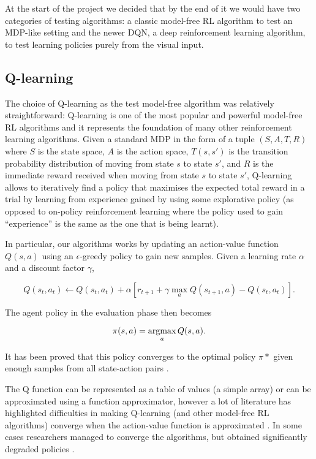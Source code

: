 At the start of the project we decided that by the end of it we would have two
categories of testing algorithms: a classic model-free RL algorithm to test an
MDP-like setting and the newer DQN, a deep reinforcement learning algorithm, to
test learning policies purely from the visual input.

\subsection{Q-learning}

The choice of Q-learning as the test model-free algorithm was relatively
straightforward: Q-learning \citep{watkins1992q} is one of the most popular and
powerful model-free RL algorithms and it represents the foundation of many other
reinforcement learning algorithms. Given a standard MDP in the form of a tuple
$(S, A, T, R)$ where $S$ is the state space, $A$ is the action space, $T(s, s')$
is the transition probability distribution of moving from state $s$ to state
$s'$, and $R$ is the immediate reward received when moving from state $s$ to
state $s'$, Q-learning allows to iteratively find a policy that maximises the
expected total reward in a trial by learning from experience gained by using
some explorative policy (as opposed to on-policy reinforcement learning where
the policy used to gain ``experience'' is the same as the one that is being
learnt).

In particular, our algorithms works by updating an action-value function $Q(s,
a)$ using an $\epsilon$-greedy policy to gain new samples. Given a learning rate
$\alpha$ and a discount factor $\gamma$,

\begin{equation}
  Q(s_t, a_t) \leftarrow Q(s_t, a_t) +
  \alpha \left[ r_{t+1} + \gamma \max_a Q(s_{t+1}, a) - Q(s_t, a_t) \right].
\label{eq:ql}
\end{equation}

The agent policy in the evaluation phase then becomes

\begin{equation}
  \pi(s, a) = \operatornamewithlimits{argmax}_a Q(s, a).
\label{eq:ql2}
\end{equation}

It has been proved that this policy converges to the optimal policy $\pi*$ given
enough samples from all state-action pairs
\citep{Sutton:1998:IRL:551283}. %

The Q function can be represented as a table of values (a simple array) or can
be approximated using a function approximator, however a lot of literature has
highlighted difficulties in making Q-learning (and other model-free RL
algorithms) converge when the action-value function is approximated
\citep{Baird_1997}. In some cases researchers managed to converge the
algorithms, but obtained significantly degraded policies
\citep{bertsekas_1996_tetris, waver_and_baxter_1999, boyan_and_moore_1995}.


